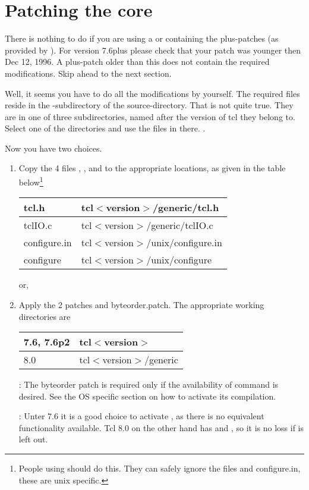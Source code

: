 \documentclass {report}
\begin{document}
\chapter  {Patching the core}\label {scalpel}

There is nothing to do if you are using a \tclsh{} or \wish{}
containing the plus-patches (as provided by \jan). For version 7.6plus
please check that your patch was younger then Dec 12, 1996. A
plus-patch older than this does not contain the required
modifications. Skip ahead to the next section.


Well, it seems you have to do all the modifications by yourself. The
required files reside in the -subdirectory of the
source-directory. That is not quite true. They are in one of three
subdirectories, named after the version of tcl they belong to. Select
one of the directories and use the files in there. .

Now you have two choices.

\begin {enumerate}
\item	Copy the 4 files , , 
	and  to the appropriate locations, as given
	in the table below\footnote {People using \win{} should do
	this. They can safely ignore the files  and \file
	{configure.in}, these are unix specific.} 

	\begin {tabular} {|l|l|} \hline
	tcl.h		& tcl$<$version$>$/generic/tcl.h	\\ \hline
	tclIO.c		& tcl$<$version$>$/generic/tclIO.c	\\ \hline
	configure.in	& tcl$<$version$>$/unix/configure.in	\\ \hline
	configure	& tcl$<$version$>$/unix/configure	\\ \hline
	\end {tabular}

	or,

\item	Apply the 2 patches  and \file
	{byteorder.patch}. The appropriate working directories are

	\begin {tabular} {|l|l|} \hline
	7.6, 7.6p2	& tcl$<$version$>$		\\ \hline
	8.0		& tcl$<$version$>$/generic	\\ \hline
	\end {tabular}

	: The byteorder patch is required only if the
	availability of command  is desired. See the OS
	specific section on how to activate its compilation.

	: Unter 7.6 it is a good choice to
	activate , as there is no equivalent functionality
	available. Tcl 8.0 on the other hand has  and
	, so it is no loss if  is left out.

\end   {enumerate}
\end{document}
